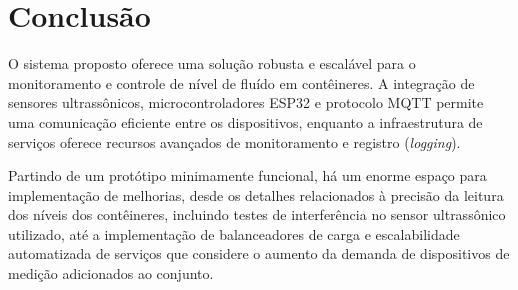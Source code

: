 \section{Conclusão}
O sistema proposto oferece uma solução robusta e escalável para o monitoramento e controle de nível de fluído em contêineres. A integração de sensores ultrassônicos, microcontroladores ESP32 e protocolo MQTT permite uma comunicação eficiente entre os dispositivos, enquanto a infraestrutura de serviços oferece recursos avançados de monitoramento e registro (\textit{logging}).

Partindo de um protótipo minimamente funcional, há um enorme espaço para implementação de melhorias, desde os detalhes relacionados à precisão da leitura dos níveis dos contêineres, incluindo testes de interferência no sensor ultrassônico utilizado, até a implementação de balanceadores de carga e escalabilidade automatizada de serviços que considere o aumento da demanda de dispositivos de medição adicionados ao conjunto.